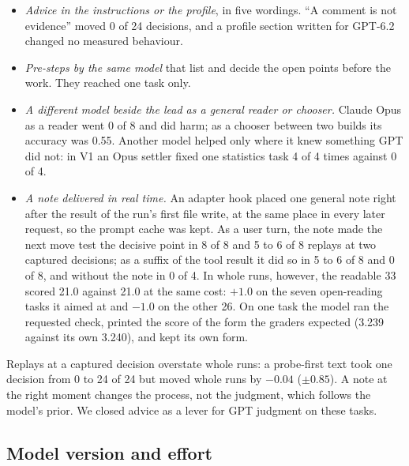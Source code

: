 \begin{itemize}[leftmargin=1.4em]
  \item \emph{Advice in the instructions or the profile}, in five wordings. ``A comment is not
    evidence'' moved 0 of 24 decisions, and a profile section written for GPT-6.2 changed no
    measured behaviour.
  \item \emph{Pre-steps by the same model} that list and decide the open points before the work.
    They reached one task only.
  \item \emph{A different model beside the lead as a general reader or chooser.} Claude Opus as a
    reader went 0 of 8 and did harm; as a chooser between two builds its accuracy was 0.55. Another
    model helped only where it knew something GPT did not: in V1 an Opus settler fixed one
    statistics task 4 of 4 times against 0 of 4.
  \item \emph{A note delivered in real time.} An adapter hook placed one general note right after
    the result of the run's first file write, at the same place in every later request, so the
    prompt cache was kept. As a user turn, the note made the next move test the decisive point in
    8 of 8 and 5 to 6 of 8 replays at two captured decisions; as a suffix of the tool result it did
    so in 5 to 6 of 8 and 0 of 8, and without the note in 0 of 4. In whole runs, however, the
    readable 33 scored 21.0 against 21.0 at the same cost: $+1.0$ on the seven open-reading tasks
    it aimed at and $-1.0$ on the other 26. On one task the model ran the requested check, printed
    the score of the form the graders expected (3.239 against its own 3.240), and kept its own
    form.
\end{itemize}

Replays at a captured decision overstate whole runs: a probe-first text took one decision from 0
to 24 of 24 but moved whole runs by $-0.04$ ($\pm 0.85$). A note at the right moment changes the
process, not the judgment, which follows the model's prior. We closed advice as a lever for GPT
judgment on these tasks.

\subsection{Model version and effort}

